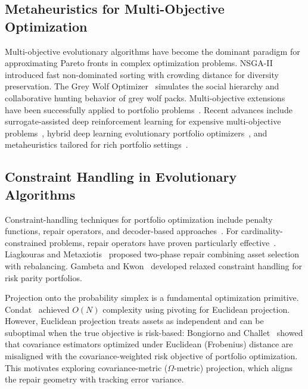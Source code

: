 \documentclass[10pt,twocolumn,a4paper]{article}
\begin{document}
\subsection{Metaheuristics for Multi-Objective Optimization}

Multi-objective evolutionary algorithms have become the dominant paradigm for approximating Pareto fronts in complex optimization problems. NSGA-II~\cite{deb2002fast} introduced fast non-dominated sorting with crowding distance for diversity preservation. The Grey Wolf Optimizer~\cite{mirjalili2014grey} simulates the social hierarchy and collaborative hunting behavior of grey wolf packs. Multi-objective extensions~\cite{mirjalili2016multi} have been successfully applied to portfolio problems~\cite{zhang2018portfolio, liagkouras2018hybrid}. Recent advances include surrogate-assisted deep reinforcement learning for expensive multi-objective problems~\cite{shao2025surrogate}, hybrid deep learning evolutionary portfolio optimizers~\cite{joshi2023intelligent}, and metaheuristics tailored for rich portfolio settings~\cite{doering2019metaheuristics}.

\subsection{Constraint Handling in Evolutionary Algorithms}

Constraint-handling techniques for portfolio optimization include penalty functions, repair operators, and decoder-based approaches~\cite{kalayci2019comprehensive}. For cardinality-constrained problems, repair operators have proven particularly effective~\cite{liagkouras2018hybrid}. Liagkouras and Metaxiotis~\cite{liagkouras2019multi} proposed two-phase repair combining asset selection with rebalancing. Gambeta and Kwon~\cite{gambeta2020risk} developed relaxed constraint handling for risk parity portfolios.

Projection onto the probability simplex is a fundamental optimization primitive. Condat~\cite{condat2016fast} achieved $O(N)$ complexity using pivoting for Euclidean projection. However, Euclidean projection treats assets as independent and can be suboptimal when the true objective is risk-based: Bongiorno and Challet~\cite{bongiorno2021nonlinear} showed that covariance estimators optimized under Euclidean (Frobenius) distance are misaligned with the covariance-weighted risk objective of portfolio optimization. This motivates exploring covariance-metric ($\Omega$-metric) projection, which aligns the repair geometry with tracking error variance.
\end{document}
